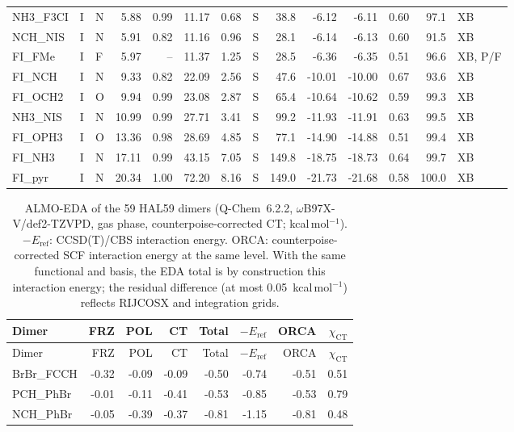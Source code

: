 \documentclass[journal=jcisd8,manuscript=suppinfo]{achemso}
\begin{document}
\begin{singlespace}
{\begin{longtable}{lllrrrrlrrrrrl}
NH3\_F3CI & I & N & 5.88 & 0.99 & 11.17 & 0.68 & S & 38.8 & -6.12 & -6.11 & 0.60 & 97.1 & XB\\
NCH\_NIS & I & N & 5.91 & 0.82 & 11.16 & 0.96 & S & 28.1 & -6.14 & -6.13 & 0.60 & 91.5 & XB\\
FI\_FMe & I & F & 5.97 & -- & 11.37 & 1.25 & S & 28.5 & -6.36 & -6.35 & 0.51 & 96.6 & XB, P/F\\
FI\_NCH & I & N & 9.33 & 0.82 & 22.09 & 2.56 & S & 47.6 & -10.01 & -10.00 & 0.67 & 93.6 & XB\\
FI\_OCH2 & I & O & 9.94 & 0.99 & 23.08 & 2.87 & S & 65.4 & -10.64 & -10.62 & 0.59 & 99.3 & XB\\
NH3\_NIS & I & N & 10.99 & 0.99 & 27.71 & 3.41 & S & 99.2 & -11.93 & -11.91 & 0.63 & 99.5 & XB\\
FI\_OPH3 & I & O & 13.36 & 0.98 & 28.69 & 4.85 & S & 77.1 & -14.90 & -14.88 & 0.51 & 99.4 & XB\\
FI\_NH3 & I & N & 17.11 & 0.99 & 43.15 & 7.05 & S & 149.8 & -18.75 & -18.73 & 0.64 & 99.7 & XB\\
FI\_pyr & I & N & 20.34 & 1.00 & 72.20 & 8.16 & S & 149.0 & -21.73 & -21.68 & 0.58 & 100.0 & XB\\
\end{longtable}}
{\scriptsize
\setlength{\tabcolsep}{3pt}
\begin{longtable}{lrrrrrrr}
\caption{ALMO-EDA of the 59 HAL59 dimers (Q-Chem~6.2.2, $\omega$B97X-V/def2-TZVPD, gas phase, counterpoise-corrected CT; kcal\,mol$^{-1}$). $-E_\mathrm{ref}$: CCSD(T)/CBS interaction energy. ORCA: counterpoise-corrected SCF interaction energy at the same level. With the same functional and basis, the EDA total is by construction this interaction energy; the residual difference (at most 0.05~kcal\,mol$^{-1}$) reflects RIJCOSX and integration grids.}\label{tab:qmeda}\\
\toprule
Dimer & FRZ & POL & CT & Total & $-E_\mathrm{ref}$ & ORCA & $\chi_\mathrm{CT}$\\
\midrule
\endfirsthead
\toprule
Dimer & FRZ & POL & CT & Total & $-E_\mathrm{ref}$ & ORCA & $\chi_\mathrm{CT}$\\
\midrule
\endhead
\bottomrule
\endlastfoot
BrBr\_FCCH & -0.32 & -0.09 & -0.09 & -0.50 & -0.74 & -0.51 & 0.51\\
PCH\_PhBr & -0.01 & -0.11 & -0.41 & -0.53 & -0.85 & -0.53 & 0.79\\
NCH\_PhBr & -0.05 & -0.39 & -0.37 & -0.81 & -1.15 & -0.81 & 0.48\\

\end{longtable}}
\end{singlespace}
\end{document}

